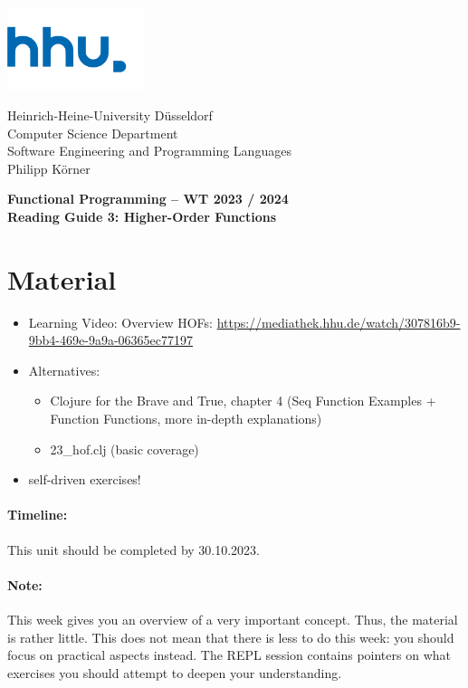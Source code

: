 \documentclass[11pt,a4paper]{article}
\begin{document}
\begin{minipage}[b]{\textwidth}
	\parbox[t]{5cm}{%
		\includegraphics[width=4cm]{unilogo}
		\hfill
	}
	\parbox[b]{11cm}{%
		Heinrich-Heine-University D\"usseldorf\\
		Computer Science Department\\
		Software Engineering and Programming Languages\\
		Philipp K\"orner
	}
\end{minipage}
\begin{center}
	\bf
	Functional Programming -- WT 2023 / 2024\\
	Reading Guide 3: Higher-Order Functions
\end{center}

\pagestyle{empty}

\section{Material} 

\begin{itemize}
    \item Learning Video: Overview HOFs: \url{https://mediathek.hhu.de/watch/307816b9-9bb4-469e-9a9a-06365ec77197}
    \item Alternatives:
        \begin{itemize}
            \item Clojure for the Brave and True, chapter 4 (Seq Function Examples + Function Functions, more in-depth explanations)
            \item 23\_hof.clj (basic coverage)
        \end{itemize}
    \item self-driven exercises!
\end{itemize}

\paragraph{Timeline:} This unit should be completed by 30.10.2023.

\paragraph{Note:} This week gives you an overview of a very important concept.
Thus, the material is rather little.
This does not mean that there is less to do this week: you should focus on practical aspects instead.
The REPL session contains pointers on what exercises you should attempt to deepen your understanding.
\end{document}
